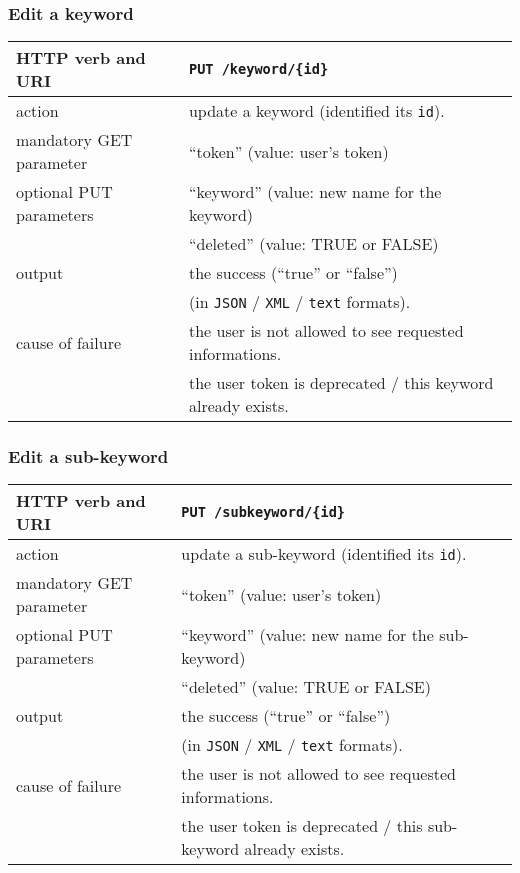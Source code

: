 \subsubsection{Edit a keyword}
\begin{tabular}{ | l | l | }
	\hline
	HTTP verb and URI & \texttt{PUT /keyword/\{id\}} \\
	\hline
	action & update a keyword (identified \via its \texttt{id}). \\
	\hline
	mandatory GET parameter & ``token'' (value: user's token) \\
	\hline
	optional PUT parameters & ``keyword'' (value: new name for the keyword) \\
	\space & ``deleted'' (value: TRUE or FALSE) \\
	\hline
	output & the success (``true'' or ``false'')  \\
	\space & (in \texttt{JSON} / \texttt{XML} / \texttt{text} formats). \\
	\hline
	cause of failure & the user is not allowed to see requested informations. \\
	\space & the user token is deprecated / this keyword already exists. \\
	\hline
\end{tabular}
\newline

\subsubsection{Edit a sub-keyword}
\begin{tabular}{ | l | l | }
	\hline
	HTTP verb and URI & \texttt{PUT /subkeyword/\{id\}} \\
	\hline
	action & update a sub-keyword (identified \via its \texttt{id}). \\
	\hline
	mandatory GET parameter & ``token'' (value: user's token) \\
	\hline
	optional PUT parameters & ``keyword'' (value: new name for the sub-keyword) \\
	\space & ``deleted'' (value: TRUE or FALSE) \\
	\hline
	output & the success (``true'' or ``false'')  \\
	\space & (in \texttt{JSON} / \texttt{XML} / \texttt{text} formats). \\
	\hline
	cause of failure & the user is not allowed to see requested informations. \\
	\space & the user token is deprecated / this sub-keyword already exists. \\
	\hline
\end{tabular}
\newline

